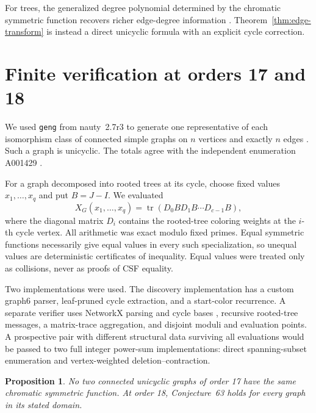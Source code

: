 \documentclass[11pt]{amsart}
\newtheorem{proposition}[theorem]{Proposition}
\theoremstyle{definition}
\newcommand{\CSF}{X}
\begin{document}
For trees, the generalized degree polynomial determined by the chromatic
symmetric function recovers richer edge-degree information
\cite{AlistePrietoEtAl2024}.  Theorem~\ref{thm:edge-transform} is instead a
direct unicyclic formula with an explicit cycle correction.

\section{Finite verification at orders 17 and 18}

We used \texttt{geng} from nauty~2.7r3 to generate one representative of each
isomorphism class of connected simple graphs on \(n\) vertices and exactly
\(n\) edges \cite{McKayPiperno2014}.  Such a graph is unicyclic.  The totals
agree with the independent enumeration A001429 \cite{OEISA001429}.

For a graph decomposed into rooted trees at its cycle, choose fixed values
\(x_1,\ldots,x_q\) and put \(B=J-I\).  We evaluated
\begin{equation}\label{eq:trace-eval}
\CSF_G(x_1,\ldots,x_q)=
\operatorname{tr}(D_0B D_1B\cdots D_{c-1}B),
\end{equation}
where the diagonal matrix \(D_i\) contains the rooted-tree coloring weights
at the \(i\)-th cycle vertex.  All arithmetic was exact modulo fixed primes.
Equal symmetric functions necessarily give equal values in every such
specialization, so unequal values are deterministic certificates of
inequality.  Equal values were treated only as collisions, never as proofs of
CSF equality.

Two implementations were used.  The discovery implementation has a custom
graph6 parser, leaf-pruned cycle extraction, and a start-color recurrence.  A
separate verifier uses NetworkX parsing and cycle bases
\cite{HagbergEtAl2008}, recursive rooted-tree messages, a matrix-trace
aggregation, and disjoint moduli and evaluation points.  A prospective pair
with different structural data surviving all evaluations would be passed to
two full integer power-sum implementations: direct spanning-subset
enumeration and vertex-weighted deletion--contraction.

\begin{proposition}\label{prop:finite}
No two connected unicyclic graphs of order 17 have the same chromatic
symmetric function.  At order 18, Conjecture~63 holds for every graph in its
stated domain.
\end{proposition}
\end{document}
